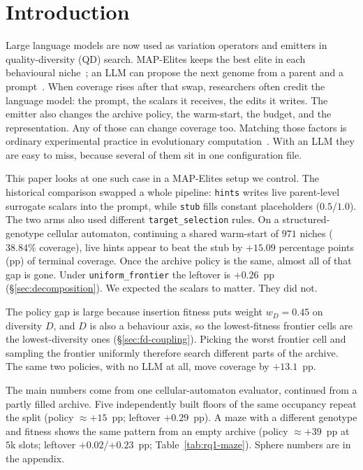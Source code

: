\documentclass[preprint,12pt]{elsarticle}
\begin{document}
\section{Introduction}
\label{sec:intro}

Large language models are now used as variation operators and emitters in quality-diversity (QD) search. MAP-Elites keeps the best elite in each behavioural niche~\cite{mouret2015illuminating}; an LLM can propose the next genome from a parent and a prompt~\cite{lehman2023openelm,nasir2024llmatic,lim2024llmqd}. When coverage rises after that swap, researchers often credit the language model: the prompt, the scalars it receives, the edits it writes. The emitter also changes the archive policy, the warm-start, the budget, and the representation. Any of those can change coverage too. Matching those factors is ordinary experimental practice in evolutionary computation~\cite{eiben2011parameter,bartzbeielstein2006experimental}. With an LLM they are easy to miss, because several of them sit in one configuration file.

This paper looks at one such case in a MAP-Elites setup we control. The historical comparison swapped a whole pipeline: \texttt{hints} writes live parent-level surrogate scalars into the prompt, while \texttt{stub} fills constant placeholders ($0.5$/$1.0$). The two arms also used different \texttt{target\_selection} rules. On a structured-genotype cellular automaton, continuing a shared warm-start of $971$ niches ($38.84\%$ coverage), live hints appear to beat the stub by $+15.09$ percentage points (pp) of terminal coverage. Once the archive policy is the same, almost all of that gap is gone. Under \texttt{uniform\_frontier} the leftover is $+0.26$~pp (\S\ref{sec:decomposition}). We expected the scalars to matter. They did not.

The policy gap is large because insertion fitness puts weight $w_D{=}0.45$ on diversity $D$, and $D$ is also a behaviour axis, so the lowest-fitness frontier cells are the lowest-diversity ones (\S\ref{sec:fd-coupling}). Picking the worst frontier cell and sampling the frontier uniformly therefore search different parts of the archive. The same two policies, with no LLM at all, move coverage by $+13.1$~pp.

The main numbers come from one cellular-automaton evaluator, continued from a partly filled archive. Five independently built floors of the same occupancy repeat the split (policy ${\approx}{+}15$~pp; leftover $+0.29$~pp). A maze with a different genotype and fitness shows the same pattern from an empty archive (policy ${\approx}{+}39$~pp at $5$k slots; leftover $+0.02$/$+0.23$~pp; Table~\ref{tab:rq1-maze}). Sphere numbers are in the appendix.
\end{document}
